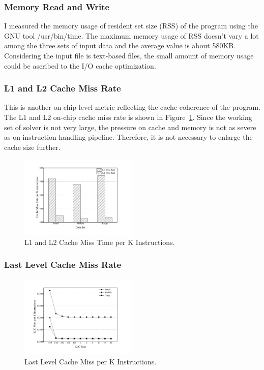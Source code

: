 \subsubsection{Memory Read and Write}
I measured the memory usage of resident set size (RSS) of the program using the GNU tool /usr/bin/time. The maximum memory usage of RSS doesn't vary a lot among the three sets of input data and the average value is about 580KB. Considering the input file is text-based files, the small amount of memory usage could be ascribed to the I/O cache optimization. 

\subsubsection{L1 and L2 Cache Miss Rate}
This is another on-chip level metric reflecting the cache coherence of the program. The L1 and L2 on-chip cache miss rate is shown in Figure~\ref{fig:cache_miss}. Since the working set of solver is not very large, the pressure on cache and memory is not as severe as on instruction handling pipeline. Therefore, it is not necessary to enlarge the cache size further.

\begin{figure}
\centering
\includegraphics[width=0.50\textwidth]{graph/cache_miss.pdf}
\caption{L1 and L2 Cache Miss Time per K Instructions.}
\label{fig:cache_miss}
\end{figure}

\subsubsection{Last Level Cache Miss Rate}

\begin{figure}
\centering
\includegraphics[width=0.50\textwidth]{graph/LLC_miss.pdf}
\caption{Last Level Cache Miss per K Instructions.}
\label{fig:LLC_miss}
\end{figure}

